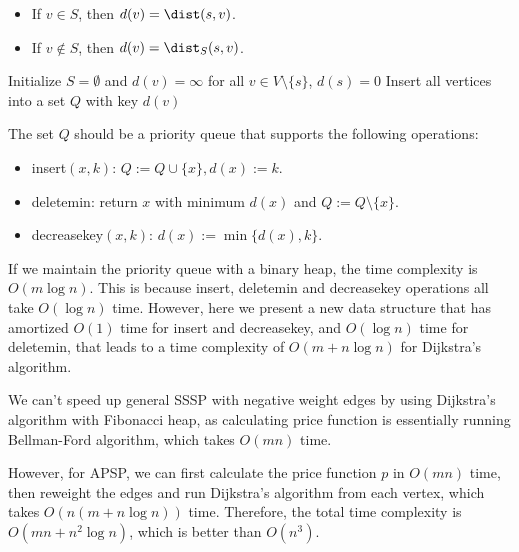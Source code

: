 \begin{itemize}
	\item If $v\in S$, then $d(v) = \dist(s,v)$.
	\item If $v\not\in S$, then $d(v) = \dist_S(s,v)$.
\end{itemize}

\begin{algorithm}[H]
	\caption{Dijkstra's Algorithm}\label{alg:dijkstra}
	Initialize $S = \emptyset$ and $d(v) = \infty$ for all $v\in V\setminus \{s\}$, $d(s) = 0$\;
	Insert all vertices into a set $Q$ with key $d(v)$\;
\end{algorithm}

The set $Q$ should be a priority queue that supports the following operations:
\begin{itemize}
	\item insert$(x,k)$: $Q:=Q\cup \{x\}, d(x) := k$.
	\item deletemin: return $x$ with minimum $d(x)$ and $Q := Q\setminus \{x\}$.
	\item decreasekey$(x,k)$: $d(x) := \min\{d(x), k\}$.
\end{itemize}

If we maintain the priority queue with a binary heap, the time complexity is $O(m \log n)$. This is because insert, deletemin and decreasekey operations all take $O(\log n)$ time.
However, here we present a new data structure that has amortized $O(1)$ time for insert and decreasekey, and $O(\log n)$ time for deletemin, that leads to a time complexity of $O(m + n \log n)$ for Dijkstra's algorithm.

\begin{remark}

	We can't speed up general SSSP with negative weight edges by using Dijkstra's algorithm with Fibonacci heap, as calculating price function is essentially running Bellman-Ford algorithm, which takes $O(mn)$ time.

	However, for APSP, we can first calculate the price function $p$ in $O(mn)$ time, then reweight the edges and run Dijkstra's algorithm from each vertex, which takes $O(n(m + n \log n))$ time. Therefore, the total time complexity is $O(mn + n^2 \log n)$, which is better than $O(n^3)$.

\end{remark}

